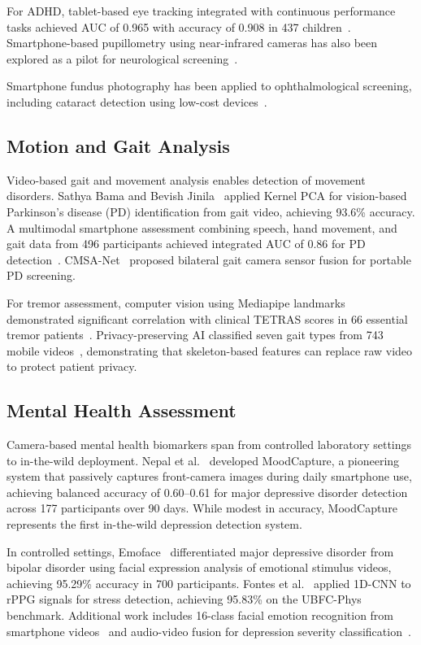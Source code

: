 \documentclass[conference]{IEEEtran}
\begin{document}
For ADHD, tablet-based eye tracking integrated with continuous performance tasks achieved AUC of 0.965 with accuracy of 0.908 in 437 children~\cite{adhdeyetracking2024,adhdbiomarker2024}. Smartphone-based pupillometry using near-infrared cameras has also been explored as a pilot for neurological screening~\cite{pupilapp2022chi}.

Smartphone fundus photography has been applied to ophthalmological screening, including cataract detection using low-cost devices~\cite{cataract2024}.

\subsection{Motion and Gait Analysis}

Video-based gait and movement analysis enables detection of movement disorders. Sathya Bama and Bevish Jinila~\cite{sathyabama2022gait} applied Kernel PCA for vision-based Parkinson's disease (PD) identification from gait video, achieving 93.6\% accuracy. A multimodal smartphone assessment combining speech, hand movement, and gait data from 496 participants achieved integrated AUC of 0.86 for PD detection~\cite{multimodalpd2025}. CMSA-Net~\cite{cmsanet2025} proposed bilateral gait camera sensor fusion for portable PD screening.

For tremor assessment, computer vision using Mediapipe landmarks demonstrated significant correlation with clinical TETRAS scores in 66 essential tremor patients~\cite{tremorcv2024}. Privacy-preserving AI classified seven gait types from 743 mobile videos~\cite{gaitclassification2025}, demonstrating that skeleton-based features can replace raw video to protect patient privacy.

\subsection{Mental Health Assessment}

Camera-based mental health biomarkers span from controlled laboratory settings to in-the-wild deployment. Nepal et al.~\cite{nepal2024moodcapture} developed MoodCapture, a pioneering system that passively captures front-camera images during daily smartphone use, achieving balanced accuracy of 0.60--0.61 for major depressive disorder detection across 177 participants over 90 days. While modest in accuracy, MoodCapture represents the first in-the-wild depression detection system.

In controlled settings, Emoface~\cite{emoface2025} differentiated major depressive disorder from bipolar disorder using facial expression analysis of emotional stimulus videos, achieving 95.29\% accuracy in 700 participants. Fontes et al.~\cite{fontes2024stress} applied 1D-CNN to rPPG signals for stress detection, achieving 95.83\% on the UBFC-Phys benchmark. Additional work includes 16-class facial emotion recognition from smartphone videos~\cite{facialemotion2025} and audio-video fusion for depression severity classification~\cite{multimodaldepression2025}.
\end{document}
